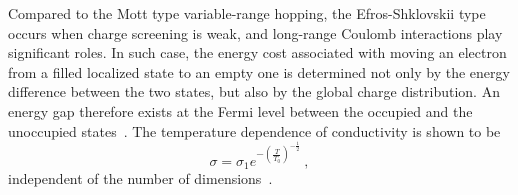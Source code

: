 Compared to the Mott type variable-range hopping, the Efros-Shklovskii type occurs when charge screening is weak, and long-range Coulomb interactions play significant roles. In such case, the energy cost associated with moving an electron from a filled localized state to an empty one is determined not only by the energy difference between the two states, but also by the global charge distribution. An energy gap therefore exists at the Fermi level between the occupied and the unoccupied states~\cite{pollak1970}. The temperature dependence of conductivity is shown to be%
\begin{equation}%
    \sigma = \sigma_1 e^{-\left(\frac{T}{T_0}\right)^{-\frac{1}{2}}}~,\label{eq:vrh_efros}%
\end{equation}%
independent of the number of dimensions~\cite{schklovskii_efros, efros1975}.